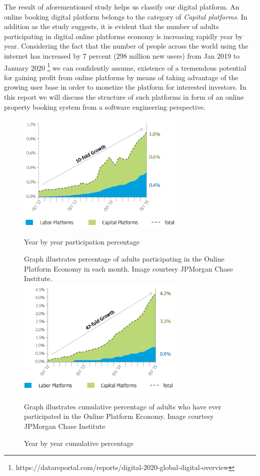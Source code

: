 The result of aforementioned study helps us classify our digital platform.
An online booking digital platform belongs to the category of \textit{Capital platforms}. In addition as the study suggests, it is evident that the number of adults participating in digital online platforms economy is increasing rapidly year by year. Considering the fact that the number of people across the world using the internet has increased by 7 percent (298 million new users) from Jan 2019 to January 2020 \footnote{https://datareportal.com/reports/digital-2020-global-digital-overview} we can confidently assume, existence of a tremendous potential for gaining profit from online platforms by means of taking advantage of the growing user base in order to monetize the platform for interested investors. In this report we will discuss the structure of such platforms in form of an online property booking system from a software engineering perspective.   

\begin{figure} 
\centering
\includegraphics[width=8cm]{pictures/adults_1.png}
\caption{Year by year participation percentage}
Graph illustrates percentage of adults participating in the
Online Platform Economy in each month. Image courtesy JPMorgan Chase Institute\cite{jpmorgan_2016}.
\label{fig:participation_1}
\\
\includegraphics[width=8cm]{pictures/adults_2.png}
\caption{Year by year cumulative percentage} 
Graph illustrates cumulative percentage of adults who have ever
participated in the Online Platform Economy. Image courtesy JPMorgan Chase Institute\cite{jpmorgan_2016}
\label{fig:participation_2}
\end{figure} 

